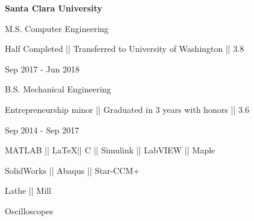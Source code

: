\vspace{7.4ex}
{\hspace{-1.72in}\textbf{Santa Clara University}}{}{}

\vspace{-2.5ex}

{{\small M.S. Computer Engineering }}
\begin{detail}
\BulletItem
Half Completed || Transferred to University of Washington || 3.8
\end{detail}

\begin{subtitle}
\vspace{-8ex}
{{Sep 2017 - Jun 2018}}
\end{subtitle}

\vspace{1ex}

{{\small B.S. Mechanical Engineering}}
\begin{detail}
\BulletItem
Entrepreneurship minor || Graduated in 3 years with honors || 3.6
\end{detail}

\begin{subtitle}
\vspace{-8ex}
{{Sep 2014 - Sep 2017}}
\end{subtitle}

{
\vspace{0.5ex}
\color{cyan}\small
{MATLAB || \LaTeX || C || Simulink || LabVIEW || Maple} %
}

{
\vspace{-2.5ex}\hspace{3.17in}
\color{cyan}\small
{SolidWorks || Abaqus || Star-CCM+} %
}

{
\vspace{-0.5ex}
\color{cyan}\small
{Lathe || Mill} %
}

{
\vspace{-2.5ex}\hspace{3.17in}
\color{cyan}\small
{Oscilloscopes} %
}

